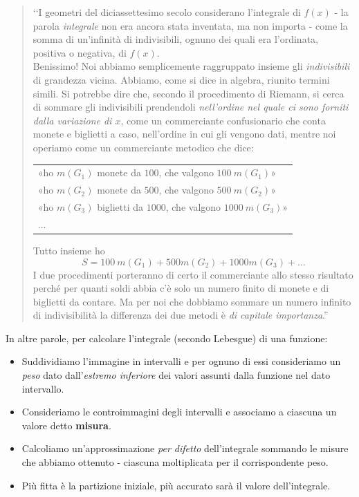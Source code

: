 \blockquote{
	‘‘I geometri del diciassettesimo secolo considerano l'integrale di $f(x)$ - la parola \textit{integrale} non era ancora stata inventata, ma non importa - come la somma di un'infinità di indivisibili, ognuno dei quali era l'ordinata, positiva o negativa, di $f(x)$.\\
	Benissimo! Noi abbiamo semplicemente raggruppato insieme gli \textit{indivisibili} di 	grandezza vicina. Abbiamo, come si dice in algebra, riunito termini simili. Si potrebbe dire che, secondo il procedimento di Riemann, si cerca di sommare gli indivisibili prendendoli \textit{nell’ordine nel quale ci sono forniti dalla variazione di $x$}, come un commerciante confusionario che conta monete e biglietti a caso,	nell’ordine in cui gli vengono dati, mentre noi operiamo come un commerciante metodico che dice:
	\begin{center}
		 \begin{tabular}{l}
			«ho $m(G_1)$ monete da $100$, che valgono $100\ m(G_1)$»\\
			«ho $m(G_2)$ monete da $500$, che valgono $500\ m(G_2)$»\\
			«ho $m(G_3)$ biglietti da $1000$, che valgono $1000\ m(G_3)$»\\
			...
		\end{tabular}
	\end{center}
	Tutto insieme ho
	\begin{equation*}
		S=100\ m(G_1) + 500 m(G_2)+ 1000 m(G_3)+\ldots
	\end{equation*}
	I due procedimenti porteranno di certo il commerciante allo stesso risultato perché per quanti soldi abbia c’è solo un numero finito di monete e di biglietti da contare. Ma per noi che dobbiamo sommare un numero infinito di indivisibilità la differenza dei due metodi è \textit{di capitale importanza}.''
}
In altre parole, per calcolare l'integrale (secondo Lebesgue) di una funzione:
\begin{itemize}
	\item Suddividiamo l'immagine in intervalli e per ognuno di essi consideriamo un \textit{peso} dato dall'\textit{estremo inferiore} dei valori assunti dalla funzione nel dato intervallo.
	\item Consideriamo le controimmagini degli intervalli e associamo a ciascuna un valore detto \textbf{misura}.
	\item Calcoliamo un'approssimazione \textit{per difetto} dell'integrale sommando le misure che abbiamo ottenuto - ciascuna moltiplicata per il corrispondente peso.
	\item Più fitta è la partizione iniziale, più accurato sarà il valore dell'integrale.
\end{itemize}

